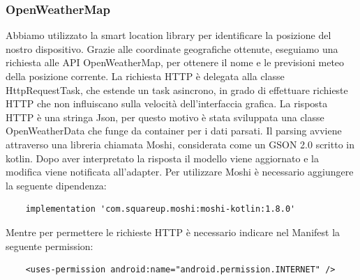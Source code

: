 \documentclass{article}
\begin{document}
\subsubsection{OpenWeatherMap}
Abbiamo utilizzato la smart location library per identificare la posizione del nostro dispositivo.
Grazie alle coordinate geografiche ottenute, eseguiamo una richiesta alle API
OpenWeatherMap, per ottenere il nome e le previsioni meteo della posizione corrente.
La richiesta HTTP è delegata alla classe HttpRequestTask, che estende un task asincrono, in grado
di effettuare richieste HTTP che non influiscano sulla velocità dell'interfaccia grafica.
La risposta HTTP è una stringa Json, per questo motivo è stata sviluppata una classe
OpenWeatherData che funge da container per i dati parsati. Il parsing avviene attraverso
una libreria chiamata Moshi, considerata come un GSON 2.0 scritto in kotlin.
Dopo aver interpretato la risposta il modello viene aggiornato e la modifica viene notificata all'adapter.
Per utilizzare Moshi è necessario aggiungere la seguente dipendenza:
\begin{lstlisting}
    implementation 'com.squareup.moshi:moshi-kotlin:1.8.0'
\end{lstlisting}
Mentre per permettere le richieste HTTP è necessario indicare nel Manifest la seguente permission:
\begin{lstlisting}
    <uses-permission android:name="android.permission.INTERNET" />
\end{lstlisting}
\end{document}
